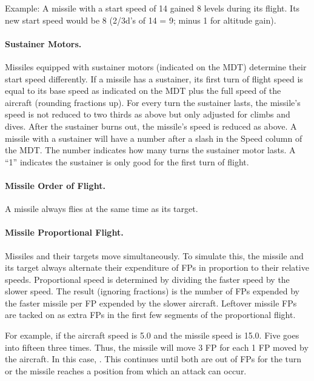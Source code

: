Example: A missile with a start speed of 14 gained 8 levels during its flight. Its new start speed would be 8 (2/3d's of 14 = 9; minus 1 for altitude gain).

\paragraph{Sustainer Motors.} Missiles equipped with sustainer motors (indicated on the MDT) determine their start speed differently. If a missile has a sustainer, its first turn of flight speed is equal to its base speed as indicated on the MDT plus the full speed of the aircraft (rounding fractions up). For every turn the sustainer lasts, the missile's speed is not reduced to two thirds as above but only adjusted for climbs and dives. After the sustainer burns out, the missile's speed is reduced as above. A missile with a sustainer will have a number after a slash in the Speed column of the MDT. The number indicates how many turns the sustainer motor lasts.  A “1” indicates the sustainer is only good for the first turn of flight.

\paragraph{Missile Order of Flight.} A missile always flies at the same time as its target.

\paragraph{Missile Proportional Flight.} Missiles and their targets move simultaneously. To simulate this, the missile and its target always alternate their expenditure of FPs in proportion to their relative speeds. Proportional speed is determined by dividing the faster speed by the slower speed. The result (ignoring fractions) is the number of FPs expended by the faster missile per FP expended by the slower aircraft.  Leftover missile FPs are tacked on as extra FPs in the first few segments of the proportional flight.

For example, if the aircraft speed is 5.0 and the missile speed is 15.0. Five goes into fifteen three times. Thus, the missile will move 3 FP for each 1 FP moved by the aircraft.  In this case, .  This continues until both are out of FPs for the turn or the missile reaches a position from which an attack can occur.

